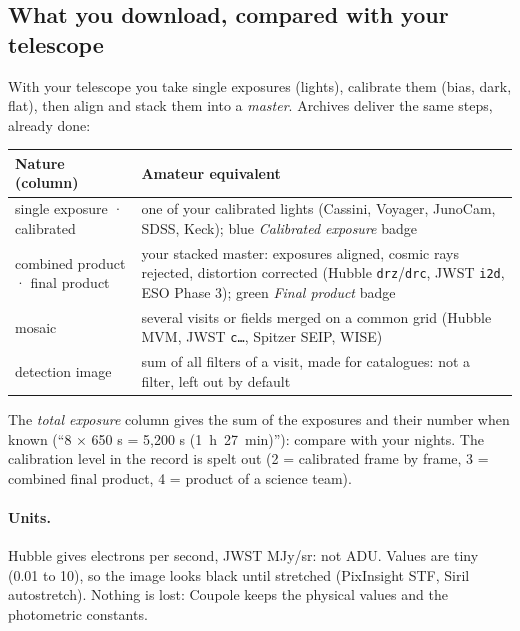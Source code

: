 \subsection{What you download, compared with your telescope}
With your telescope you take single exposures (lights), calibrate them (bias, dark, flat), then align and stack
them into a \emph{master}. Archives deliver the same steps, already done:
\begin{center}\small
\begin{tabularx}{\linewidth}{@{}lX@{}}
\toprule
\textbf{Nature (column)} & \textbf{Amateur equivalent}\\
\midrule
single exposure · calibrated & one of your calibrated lights (Cassini, Voyager, JunoCam, SDSS, Keck); blue \emph{Calibrated exposure} badge\\
combined product · final product & your stacked master: exposures aligned, cosmic rays rejected, distortion corrected (Hubble \texttt{drz}/\texttt{drc}, JWST \texttt{i2d}, ESO Phase 3); green \emph{Final product} badge\\
mosaic & several visits or fields merged on a common grid (Hubble MVM, JWST \texttt{c…}, Spitzer SEIP, WISE)\\
detection image & sum of all filters of a visit, made for catalogues: not a filter, left out by default\\
\bottomrule
\end{tabularx}
\end{center}
The \emph{total exposure} column gives the sum of the exposures and their number when known (``8 × 650 s = 5,200 s
(1~h~27~min)''): compare with your nights. The calibration level in the record is spelt out (2 = calibrated frame by
frame, 3 = combined final product, 4 = product of a science team).

\paragraph{Units.} Hubble gives electrons per second, JWST MJy/sr: not ADU. Values are tiny (0.01 to 10), so the
image looks black until stretched (PixInsight STF, Siril autostretch). Nothing is lost: Coupole keeps the physical
values and the photometric constants.

